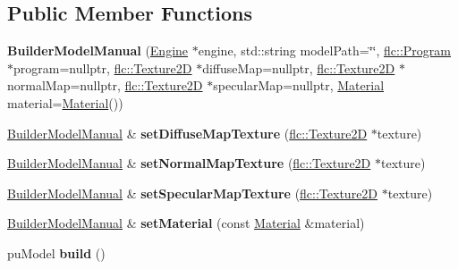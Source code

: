 \subsection*{Public Member Functions}
\begin{DoxyCompactItemize}
\item 
\mbox{\label{classflw_1_1flf_1_1BuilderModelManual_abb0c94af4b0f544fcde71ce11129fe58}} 
{\bfseries Builder\+Model\+Manual} (\hyperlink{classflw_1_1Engine}{Engine} $\ast$engine, std\+::string model\+Path=\char`\"{}\char`\"{}, \hyperlink{classflw_1_1flc_1_1Program}{flc\+::\+Program} $\ast$program=nullptr, \hyperlink{classflw_1_1flc_1_1Texture2D}{flc\+::\+Texture2D} $\ast$diffuse\+Map=nullptr, \hyperlink{classflw_1_1flc_1_1Texture2D}{flc\+::\+Texture2D} $\ast$normal\+Map=nullptr, \hyperlink{classflw_1_1flc_1_1Texture2D}{flc\+::\+Texture2D} $\ast$specular\+Map=nullptr, \hyperlink{classflw_1_1flf_1_1Material}{Material} material=\hyperlink{classflw_1_1flf_1_1Material}{Material}())
\item 
\mbox{\label{classflw_1_1flf_1_1BuilderModelManual_ac147d3e5a9adcf0561d3831f44b592f3}} 
\hyperlink{classflw_1_1flf_1_1BuilderModelManual}{Builder\+Model\+Manual} \& {\bfseries set\+Diffuse\+Map\+Texture} (\hyperlink{classflw_1_1flc_1_1Texture2D}{flc\+::\+Texture2D} $\ast$texture)
\item 
\mbox{\label{classflw_1_1flf_1_1BuilderModelManual_a472cbfc8bdb0bf654f761e21f6f19838}} 
\hyperlink{classflw_1_1flf_1_1BuilderModelManual}{Builder\+Model\+Manual} \& {\bfseries set\+Normal\+Map\+Texture} (\hyperlink{classflw_1_1flc_1_1Texture2D}{flc\+::\+Texture2D} $\ast$texture)
\item 
\mbox{\label{classflw_1_1flf_1_1BuilderModelManual_acdd90ebb159ce182c9b970ca54371708}} 
\hyperlink{classflw_1_1flf_1_1BuilderModelManual}{Builder\+Model\+Manual} \& {\bfseries set\+Specular\+Map\+Texture} (\hyperlink{classflw_1_1flc_1_1Texture2D}{flc\+::\+Texture2D} $\ast$texture)
\item 
\mbox{\label{classflw_1_1flf_1_1BuilderModelManual_a3b3abbd5aca8f472306aaa8f195468ff}} 
\hyperlink{classflw_1_1flf_1_1BuilderModelManual}{Builder\+Model\+Manual} \& {\bfseries set\+Material} (const \hyperlink{classflw_1_1flf_1_1Material}{Material} \&material)
\item 
\mbox{\label{classflw_1_1flf_1_1BuilderModelManual_a439cfce3c4cef0ae98ac15be6e40e710}} 
pu\+Model {\bfseries build} ()
\end{DoxyCompactItemize}
